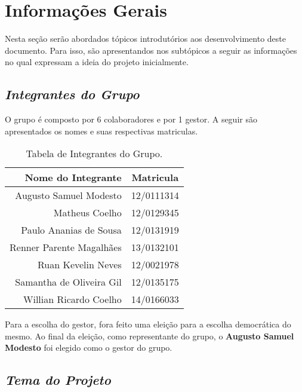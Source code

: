 \chapter[Informações Gerais]{Informações Gerais}
\label{chap:informacoesGerais}
	
	Nesta seção serão abordados tópicos introdutórios aos desenvolvimento deste documento. Para isso, são apresentandos nos subtópicos a seguir as informações no qual expressam a ideia do projeto inicialmente.

	\section[Integrantes do Grupo]{\emph{Integrantes do Grupo}}
	\label{sec:informacoesGerais_integrantes}

		O grupo é composto por 6 colaboradores e por 1 gestor. A seguir são apresentados os nomes e suas respectivas matriculas.

		\label{subsubsec:informacoesGerais_integrantes_tables}
		\begin{table}[h]
			\centering 
			\begin{tabular}{r|c}

				Nome do Integrante & Matricula \\
				
				\hline

				Augusto Samuel Modesto & 12/0111314 \\
				Matheus Coelho & 12/0129345 \\
				Paulo Ananias de Sousa & 12/0131919 \\
				Renner Parente Magalhães & 13/0132101 \\
				Ruan Kevelin Neves & 12/0021978 \\
				Samantha de Oliveira Gil & 12/0135175 \\
				Willian Ricardo Coelho & 14/0166033 \\

			\end{tabular}
			\caption[Tabela de Integrantes do Grupo]{Tabela de Integrantes do Grupo.}
			\label{tab:informacoesGerais_integrantes_.tables}
		\end{table}

		Para a escolha do gestor, fora feito uma eleição para a escolha democrática do mesmo. Ao final da eleição, como representante do grupo, o \textbf{Augusto Samuel Modesto} foi elegido como o gestor do grupo.

	\section[Tema do Projeto]{\emph{Tema do Projeto}}
	\label{sec:informacoesGerais_tema}

